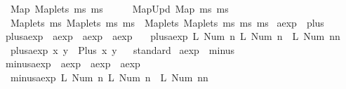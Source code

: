 \begin{isabellebody}
\ \ {\isachardoublequoteopen}{\isacharunderscore}Map\ {\isacharparenleft}{\isacharunderscore}Maplets\ ms{}\ ms{}{\isacharparenright}{\isachardoublequoteclose}\ \ \ \ \ {\isasymleftharpoondown}\ {\isachardoublequoteopen}{\isacharunderscore}MapUpd\ {\isacharparenleft}{\isacharunderscore}Map\ ms{}{\isacharparenright}\ ms{}{\isachardoublequoteclose}\isanewline
\ \ {\isachardoublequoteopen}{\isacharunderscore}Maplets\ ms{}\ {\isacharparenleft}{\isacharunderscore}Maplets\ ms{}\ ms{}{\isacharparenright}{\isachardoublequoteclose}\ {\isasymleftharpoondown}\ {\isachardoublequoteopen}{\isacharunderscore}Maplets\ {\isacharparenleft}{\isacharunderscore}Maplets\ ms{}\ ms{}{\isacharparenright}\ ms{}{\isachardoublequoteclose}\isanewline
\isanewline
\isanewline
\isanewline
{}\isamarkupfalse%
\ aexp\ {\isacharcolon}{\isacharcolon}\ plus\ \isanewline
{}\isamarkupfalse%
\ plus{\isacharunderscore}aexp\ {\isacharcolon}{\isacharcolon}\ {\isachardoublequoteopen}aexp\ {\isasymRightarrow}\ aexp\ {\isasymRightarrow}\ aexp{\isachardoublequoteclose}\ \isanewline
\ \ {\isachardoublequoteopen}plus{\isacharunderscore}aexp\ {\isacharparenleft}L\ {\isacharparenleft}Num\ n{}{\isacharparenright}{\isacharparenright}\ {\isacharparenleft}L\ {\isacharparenleft}Num\ n{}{\isacharparenright}{\isacharparenright}\ {\isacharequal}\ L\ {\isacharparenleft}Num\ {\isacharparenleft}n{}{\isacharplus}n{}{\isacharparenright}{\isacharparenright}{\isachardoublequoteclose}\ {\isacharbar}\isanewline
\ \ {\isachardoublequoteopen}plus{\isacharunderscore}aexp\ x\ y\ {\isacharequal}\ Plus\ x\ y{\isachardoublequoteclose}\isanewline
\isanewline
{}\isamarkupfalse%
%
\isadelimproof
\ %
\endisadelimproof
%
\isatagproof
{}\isamarkupfalse%
\ standard%
\endisatagproof
{\isafoldproof}%
%
\isadelimproof
%
\endisadelimproof
\isanewline
{}\isamarkupfalse%
\isanewline
\isanewline
{}\isamarkupfalse%
\ aexp\ {\isacharcolon}{\isacharcolon}\ minus\ \isanewline
{}\isamarkupfalse%
\ minus{\isacharunderscore}aexp\ {\isacharcolon}{\isacharcolon}\ {\isachardoublequoteopen}aexp\ {\isasymRightarrow}\ aexp\ {\isasymRightarrow}\ aexp{\isachardoublequoteclose}\ \isanewline
\ \ {\isachardoublequoteopen}minus{\isacharunderscore}aexp\ {\isacharparenleft}L\ {\isacharparenleft}Num\ n{}{\isacharparenright}{\isacharparenright}\ {\isacharparenleft}L\ {\isacharparenleft}Num\ n{}{\isacharparenright}{\isacharparenright}\ {\isacharequal}\ L\ {\isacharparenleft}Num\ {\isacharparenleft}n{}{\isacharminus}n{}{\isacharparenright}{\isacharparenright}{\isachardoublequoteclose}\ {\isacharbar}\isanewline

\end{isabellebody}
